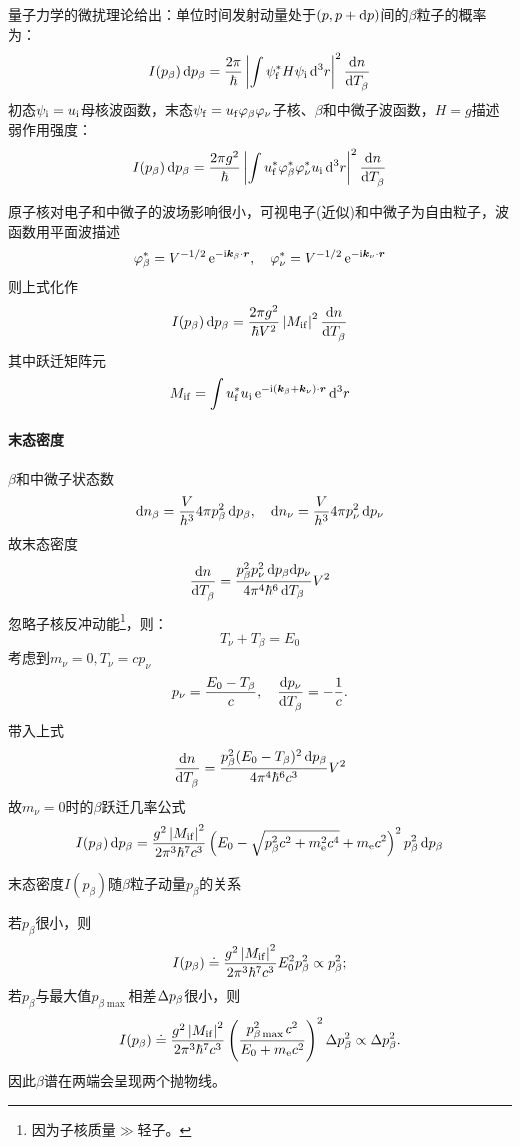 量子力学的微扰理论给出：单位时间发射动量处于$(p,p+\mathop{}\!\mathrm{d} p)$间的$\beta$粒子的概率为：
\[
	I(p_\beta)\mathop{}\!\mathrm{d} p_\beta=\frac{2\pi}\hbar\left\lvert\int\psi_{\mathrm{f}}^\ast H\psi_{\mathrm{i}}\mathop{}\!\mathrm{d}^3r\right\rvert^2\frac{\mathrm{d}^{\;\!\!}n}{\mathrm{d} T_\beta^{\;\!\!}}
\]
初态$\psi_{\mathrm{i}}=u_{\mathrm{i}}$母核波函数，末态$\psi_{\mathrm{f}}=u_{\mathrm{f}}\varphi_\beta\varphi_\nu$子核、$\beta$和中微子波函数，$H=g$描述弱作用强度：
\[
	I(p_\beta)\mathop{}\!\mathrm{d} p_\beta=\frac{2\pi g^2}\hbar\left\lvert\int u_{\mathrm{f}}^\ast\varphi_\beta^\ast\varphi_\nu^\ast u_{\mathrm{i}}\mathop{}\!\mathrm{d}^3r\right\rvert^2\frac{\mathrm{d}^{\;\!\!}n}{\mathrm{d} T_\beta^{\;\!\!}}
\]

原子核对电子和中微子的波场影响很小，可视电子(近似)和中微子为自由粒子，波函数用平面波描述
\[
	\varphi_\beta^\ast=V^{-1/2}\mathop{}\!\mathrm{e}^{-\mathrm{i}\bm k_\beta\cdot\bm r},\quad\varphi_\nu^\ast=V^{-1/2}\mathop{}\!\mathrm{e}^{-\mathrm{i}\bm k_\nu\cdot\bm r}
\]
则上式化作
\[
	I(p_\beta)\mathop{}\!\mathrm{d} p_\beta=\frac{2\pi g^2}{\hbar V^2}\left\lvert M_{\mathrm{i}\mathrm{f}}\right\rvert^2\frac{\mathrm{d}^{\;\!\!}n}{\mathrm{d} T_\beta^{\;\!\!}}
\]
其中跃迁矩阵元
\begin{align}\label{transition matrix element}
	M_{\mathrm{i}\mathrm{f}}=\int u_{\mathrm{f}}^\ast u_{\mathrm{i}}\mathop{}\!\mathrm{e}^{-\mathrm{i}(\bm k_\beta+\bm k_\nu)\cdot\bm r}\mathop{}\!\mathrm{d}^3r
\end{align}

\paragraph{末态密度}$\beta$和中微子状态数
\[
	\mathop{}\!\mathrm{d} n_\beta=\frac V{h^3}4\pi p_\beta^2\mathop{}\!\mathrm{d} p_\beta,\quad \mathop{}\!\mathrm{d} n_\nu=\frac V{h^3}4\pi p_\nu^2\mathop{}\!\mathrm{d} p_\nu
\]
故末态密度
\[
	\frac{\mathrm{d}^{\;\!\!}n}{\mathrm{d} T_\beta^{\;\!\!}}=\frac{p_\beta^2p_\nu^2\mathop{}\!\mathrm{d} p_\beta\mathrm{d} p_\nu}{4\pi^4\hbar^6\mathop{}\!\mathrm{d} T_\beta}V^2
\]
忽略子核反冲动能\footnote{因为子核质量$\gg$轻子。}，则：
\[
	T_\nu+T_\beta=E_0
\]
考虑到$m_\nu=0,T_\nu=cp_\nu$
\[
	p_\nu=\frac{E_0-T_\beta}c,\quad\frac{\mathrm{d}^{\;\!\!}p_\nu}{\mathrm{d} T_\beta^{\;\!\!}}=-\frac1c.
\]
带入上式
\[
	\frac{\mathrm{d}^{\;\!\!}n}{\mathrm{d} T_\beta^{\;\!\!}}=\frac{p_\beta^2(E_0-T_\beta)^2\mathop{}\!\mathrm{d} p_\beta}{4\pi^4\hbar^6c^3}V^2
\]
故$m_\nu=0$时的$\beta$跃迁几率公式
\begin{align}\label{beta-decay Prob}
	I(p_\beta)\mathop{}\!\mathrm{d} p_\beta=\frac{g^2\left\lvert M_{\mathrm{i}\mathrm{f}}\right\rvert^2}{2\pi^3\hbar^7c^3}\left(E_0-\sqrt{p_\beta^2c^2+m_\mathrm e^2c^4}+m_\mathrm e c^2\right)^2p_\beta^2\mathop{}\!\mathrm{d} p_\beta
\end{align}
\begin{center}
	\tikzchap 末态密度$I(p_\beta)$随$\beta$粒子动量$p_\beta$的关系
\end{center}
若$p_\beta$很小，则
\[
	I(p_\beta)\doteq\frac{g^2\left\lvert M_{\mathrm{i}\mathrm{f}}\right\rvert^2}{2\pi^3\hbar^7c^3}E_0^2p_\beta^2\propto p_\beta^2;
\]
若$p_\beta$与最大值$p_{\beta\max{}}$相差$\Delta p_\beta$很小，则
\[
	I(p_\beta)\doteq\frac{g^2\left\lvert M_{\mathrm{i}\mathrm{f}}\right\rvert^2}{2\pi^3\hbar^7c^3}\left(\frac{p_{\beta\max{}}^2c^2}{E_0+m_\mathrm e c^2}\right)^2\Delta p_\beta^2\propto\Delta p_\beta^2.
\]
因此$\beta$谱在两端会呈现两个抛物线。


